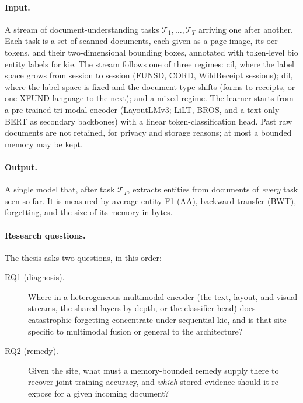 \paragraph{Input.} A stream of document-understanding tasks
$\mathcal{T}_1,\dots,\mathcal{T}_T$ arriving one after another. Each task is a set of scanned
documents, each given as a page image, its \gls{ocr} tokens, and their two-dimensional
bounding boxes, annotated with token-level \gls{bio} entity labels for \gls{kie}. The stream
follows one of three regimes: \gls{cil}, where the label space grows from session to session
(FUNSD, CORD, WildReceipt sessions); \gls{dil}, where the label space is fixed and the document
type shifts (forms to receipts, or one XFUND language to the next); and a mixed regime. The
learner starts from a pre-trained tri-modal encoder (LayoutLMv3; LiLT, BROS, and a text-only
BERT as secondary backbones) with a linear token-classification head. Past raw documents are
not retained, for privacy and storage reasons; at most a bounded memory may be kept.

\paragraph{Output.} A single model that, after task $\mathcal{T}_T$, extracts entities from
documents of \emph{every} task seen so far. It is measured by average entity-F1 (AA), backward
transfer (BWT), forgetting, and the size of its memory in bytes.

\paragraph{Research questions.} The thesis asks two questions, in this order:
\begin{description}
  \item[RQ1 (diagnosis).] Where in a heterogeneous multimodal encoder (the text, layout, and
        visual streams, the shared layers by depth, or the classifier head) does catastrophic
        forgetting concentrate under sequential \gls{kie}, and is that site specific to
        multimodal fusion or general to the architecture?
  \item[RQ2 (remedy).] Given the site, what must a memory-bounded remedy supply there to
        recover joint-training accuracy, and \emph{which} stored evidence should it re-expose
        for a given incoming document?
\end{description}

